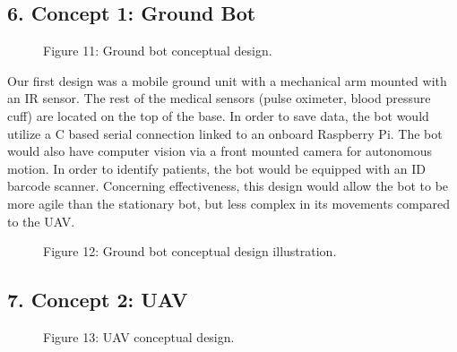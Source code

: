 ﻿\documentclass[10pt]{article}
\begin{document}
\subsection{6. Concept 1:  Ground Bot}
%	
%
%	
%
\begin{figure}
\caption{Figure 11: Ground bot conceptual design.}
\label{fig:11}
\end{figure}

Our first design was a mobile ground unit with a mechanical arm mounted with an IR sensor. The rest of the medical sensors (pulse oximeter, blood pressure cuff) are located on the top of the base. In order to save data, the bot would utilize a C based serial connection linked to an onboard Raspberry Pi. The bot would also have computer vision via a front mounted camera for autonomous motion. In order to identify patients, the bot would be equipped with an ID barcode scanner. Concerning effectiveness, this design would allow the bot to be more agile than the stationary bot, but less complex in its movements compared to the UAV. 
\begin{figure}
\caption{Figure 12: Ground bot conceptual design illustration.}
\label{fig:12}
\end{figure}

\subsection{7. Concept 2:  UAV}
%	
%
\begin{figure}
\caption{Figure 13: UAV conceptual design.}
\label{fig:13}
\end{figure}
\end{document}
